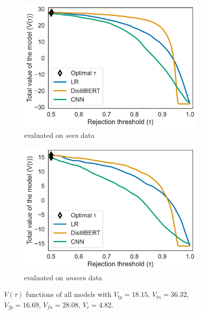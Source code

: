 \begin{figure}
    \centering
    \begin{subfigure}{.49\textwidth}
        \centering
        \includegraphics[scale=.4]{Figures/metric-all-values-seen-data.pdf}
        \caption{evaluated on \emph{seen} data}
    \end{subfigure}
    \begin{subfigure}{.49\textwidth}
        \centering
        \includegraphics[scale=.4]{Figures/metric-all-values-unseen-data.pdf}
        \caption{evaluated on \emph{unseen} data}
    \end{subfigure}
    \caption{$V(\tau)$ functions of all models with $V_{tp} = 18.15$, $V_{tn} = 36.32$, $V_{fp} = 16.69$, $V_{fn} = 28.08$, $V_r = 4.82$.}
    \label{fig:metric-plots-all-values}
\end{figure}

